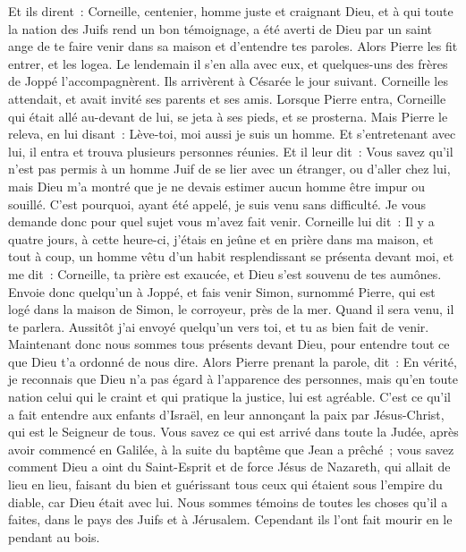 \begin{multicols}{2}
Et ils dirent~: Corneille, centenier, homme juste et craignant Dieu, et à qui toute la nation des Juifs rend un bon témoignage, a été averti de Dieu par un saint ange de te faire venir dans sa maison et d'entendre tes paroles.
Alors Pierre les fit entrer, et les logea. Le lendemain il s'en alla avec eux, et quelques-uns des frères de Joppé l'accompagnèrent.
Ils arrivèrent à Césarée le jour suivant. Corneille les attendait, et avait invité ses parents et ses amis.
Lorsque Pierre entra, Corneille qui était allé au-devant de lui, se jeta à ses pieds, et se prosterna.
Mais Pierre le releva, en lui disant~: Lève-toi, moi aussi je suis un homme.
Et s'entretenant avec lui, il entra et trouva plusieurs personnes réunies.
Et il leur dit~: Vous savez qu'il n'est pas permis à un homme Juif de se lier avec un étranger, ou d'aller chez lui, mais Dieu m'a montré que je ne devais estimer aucun homme être impur ou souillé.
C'est pourquoi, ayant été appelé, je suis venu sans difficulté. Je vous demande donc pour quel sujet vous m'avez fait venir.
Corneille lui dit~: Il y a quatre jours, à cette heure-ci, j'étais en jeûne et en prière dans ma maison, et tout à coup, un homme vêtu d'un habit resplendissant se présenta devant moi, et me dit~:
Corneille, ta prière est exaucée, et Dieu s'est souvenu de tes aumônes.
Envoie donc quelqu'un à Joppé, et fais venir Simon, surnommé Pierre, qui est logé dans la maison de Simon, le corroyeur, près de la mer. Quand il sera venu, il te parlera.
Aussitôt j'ai envoyé quelqu'un vers toi, et tu as bien fait de venir. Maintenant donc nous sommes tous présents devant Dieu, pour entendre tout ce que Dieu t'a ordonné de nous dire.
Alors Pierre prenant la parole, dit~: En vérité, je reconnais que Dieu n'a pas égard à l'apparence des personnes,
mais qu'en toute nation celui qui le craint et qui pratique la justice, lui est agréable.
C'est ce qu'il a fait entendre aux enfants d'Israël, en leur annonçant la paix par Jésus-Christ, qui est le Seigneur de tous.
Vous savez ce qui est arrivé dans toute la Judée, après avoir commencé en Galilée, à la suite du baptême que Jean a prêché~;
vous savez comment Dieu a oint du Saint-Esprit et de force Jésus de Nazareth, qui allait de lieu en lieu, faisant du bien et guérissant tous ceux qui étaient sous l'empire du diable, car Dieu était avec lui.
Nous sommes témoins de toutes les choses qu'il a faites, dans le pays des Juifs et à Jérusalem. Cependant ils l'ont fait mourir en le pendant au bois.

\end{multicols}
